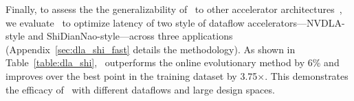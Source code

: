 %
Finally, to assess the the generalizability of \primemethodname\ to other accelerator architectures~\citep{kao2020confuciux}, we evaluate \primemethodname\ to optimize latency of two style of dataflow accelerators---NVDLA-style and ShiDianNao-style---across three applications (Appendix~\ref{sec:dla_shi_fast} details the methodology).
%
As shown in Table~\ref{table:dla_shi}, \primemethodname\ outperforms the online evolutionary method by 6\% and improves over the best point in the training dataset by 3.75$\times$.
%
This demonstrates the efficacy of \primemethodname\ with different dataflows and large design spaces.
%

